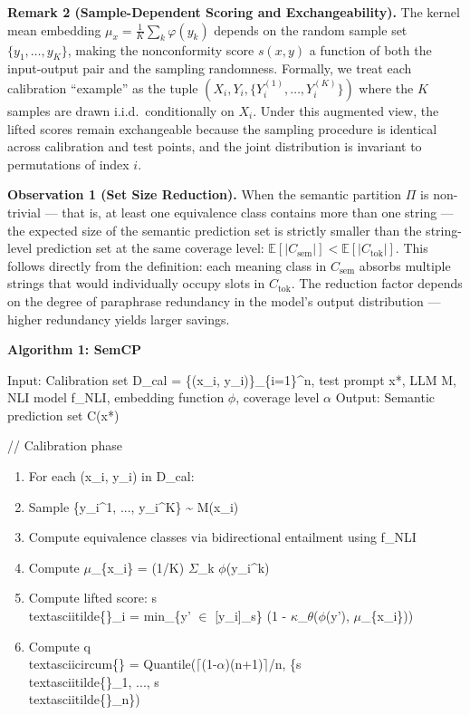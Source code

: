 \documentclass{article}
\begin{document}
\textbf{Remark 2 (Sample-Dependent Scoring and Exchangeability).} The kernel mean embedding $\mu_x = \frac{1}{K}\sum_k \varphi(y_k)$ depends on the random sample set $\{y_1, \ldots, y_K\}$, making the nonconformity score $s(x, y)$ a function of both the input-output pair and the sampling randomness. Formally, we treat each calibration ``example'' as the tuple $(X_i, Y_i, \{Y_i^{(1)}, \ldots, Y_i^{(K)}\})$ where the $K$ samples are drawn i.i.d.\ conditionally on $X_i$. Under this augmented view, the lifted scores remain exchangeable because the sampling procedure is identical across calibration and test points, and the joint distribution is invariant to permutations of index $i$.

\textbf{Observation 1 (Set Size Reduction).} When the semantic partition $\Pi$ is non-trivial --- that is, at least one equivalence class contains more than one string --- the expected size of the semantic prediction set is strictly smaller than the string-level prediction set at the same coverage level: $\mathbb{E}[|C_{\text{sem}}|] < \mathbb{E}[|C_{\text{tok}}|]$. This follows directly from the definition: each meaning class in $C_{\text{sem}}$ absorbs multiple strings that would individually occupy slots in $C_{\text{tok}}$. The reduction factor depends on the degree of paraphrase redundancy in the model's output distribution --- higher redundancy yields larger savings.

\textbf{Algorithm 1: SemCP}

Input: Calibration set D\_cal = \{(x\_i, y\_i)\}\_\{i=1\}\textasciicircum{}n, test prompt x*,
       LLM M, NLI model f\_NLI, embedding function $\phi$, coverage level $\alpha$
Output: Semantic prediction set C(x*)

// Calibration phase
\begin{enumerate}
  \item For each (x\_i, y\_i) in D\_cal:
  \item Sample \{y\_i\textasciicircum{}1, ..., y\_i\textasciicircum{}K\} \textasciitilde{} M(x\_i)
  \item Compute equivalence classes via bidirectional entailment using f\_NLI
  \item Compute $\mu$\_\{x\_i\} = (1/K) $\Sigma$\_k $\phi$(y\_i\textasciicircum{}k)
  \item Compute lifted score: s\\textasciitilde{}\{\}\_i = min\_\{y' $\in$ [y\_i]\_s\} (1 - $\kappa$\_$\theta$($\phi$(y'), $\mu$\_\{x\_i\}))
  \item Compute q\\textasciicircum{}\{\} = Quantile($\lceil$(1-$\alpha$)(n+1)$\rceil$/n, \{s\\textasciitilde{}\{\}\_1, ..., s\\textasciitilde{}\{\}\_n\})
\end{enumerate}
\end{document}
